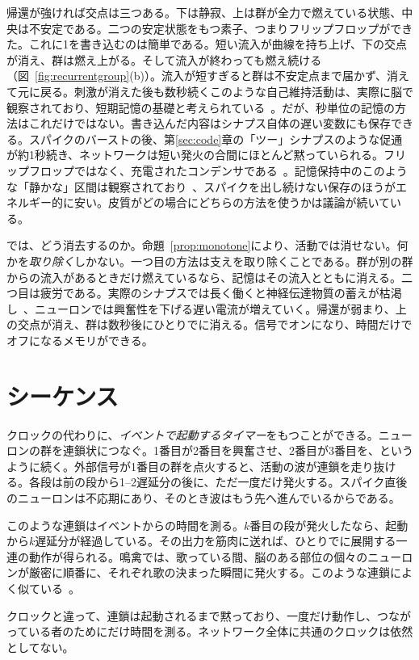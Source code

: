帰還が強ければ交点は三つある。下は静寂、上は群が全力で燃えている状態、中央は不安定である。二つの安定状態をもつ素子、つまりフリップフロップができた。これに1を書き込むのは簡単である。短い流入が曲線を持ち上げ、下の交点が消え、群は燃え上がる。そして流入が終わっても燃え続ける（図~\ref{fig:recurrentgroup}(b)）。流入が短すぎると群は不安定点まで届かず、消えて元に戻る。刺激が消えた後も数秒続くこのような自己維持活動は、実際に脳で観察されており、短期記憶の基礎と考えられている~\cite{Wang2001}。だが、秒単位の記憶の方法はこれだけではない。書き込んだ内容はシナプス自体の遅い変数にも保存できる。スパイクのバーストの後、第\ref{sec:code}章の「ツー」シナプスのような促通が約1秒続き、ネットワークは短い発火の合間にほとんど黙っていられる。フリップフロップではなく、充電されたコンデンサである~\cite{Mongillo2008}。記憶保持中のこのような「静かな」区間は観察されており~\cite{Stokes2015}、スパイクを出し続けない保存のほうがエネルギー的に安い。皮質がどの場合にどちらの方法を使うかは議論が続いている。

では、どう消去するのか。命題~\ref{prop:monotone}により、活動では消せない。何かを\emph{取り除く}しかない。一つ目の方法は支えを取り除くことである。群が別の群からの流入があるときだけ燃えているなら、記憶はその流入とともに消える。二つ目は疲労である。実際のシナプスでは長く働くと神経伝達物質の蓄えが枯渇し~\cite{Tsodyks1997}、ニューロンでは興奮性を下げる遅い電流が増えていく。帰還が弱まり、上の交点が消え、群は数秒後にひとりでに消える。信号でオンになり、時間だけでオフになるメモリができる。

\section{シーケンス}

クロックの代わりに、\emph{イベントで起動するタイマー}をもつことができる。ニューロンの群を連鎖状につなぐ。1番目が2番目を興奮させ、2番目が3番目を、というように続く。外部信号が1番目の群を点火すると、活動の波が連鎖を走り抜ける。各段は前の段から1--2遅延分の後に、ただ一度だけ発火する。スパイク直後のニューロンは不応期にあり、そのとき波はもう先へ進んでいるからである。

このような連鎖はイベントからの時間を測る。$k$番目の段が発火したなら、起動から$k$遅延分が経過している。その出力を筋肉に送れば、ひとりでに展開する一連の動作が得られる。鳴禽では、歌っている間、脳のある部位の個々のニューロンが厳密に順番に、それぞれ歌の決まった瞬間に発火する。このような連鎖によく似ている~\cite{Hahnloser2002}。

クロックと違って、連鎖は起動されるまで黙っており、一度だけ動作し、つながっている者のためにだけ時間を測る。ネットワーク全体に共通のクロックは依然としてない。

